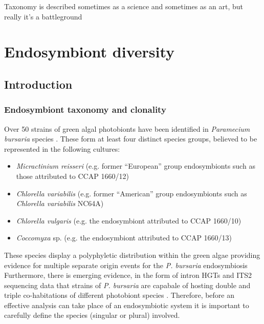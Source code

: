 % 
\graphicspath{{chapters/3.Chapter_1/figures/}}


\begin{savequote}[75mm]
    Taxonomy is described sometimes as a science and sometimes as an art, but really it's a battleground
\end{savequote}

\chapter{Endosymbiont diversity}\label{chap:endo_diversity}

\section{Introduction}

\subsection{Endosymbiont taxonomy and clonality}

Over 50 strains of green algal photobionts have been identified in 
\textit{Paramecium bursaria} species \citep{Hoshina2010,Hoshina2004,Hoshina2009,Summerer2008,Vorobyev2009}. 
These form at least four distinct species groups, believed to be represented
in the following cultures:
\begin{itemize}
    \item \textit{Micractinium reisseri} (e.g. former ``European'' group endosymbionts such as those attributed to CCAP 1660/12)
    \item \textit{Chlorella variabilis} (e.g. former ``American'' group endosymbionts such as \textit{Chlorella variabilis} NC64A)
    \item \textit{Chlorella vulgaris} (e.g. the endosymbiont attributed to CCAP 1660/10)
    \item \textit{Coccomyxa} sp. (e.g. the endosymbiont attributed to CCAP 1660/13)
\end{itemize}
These species display a polyphyletic distribution within the green algae
providing evidence for multiple separate origin events for
the \textit{P. bursaria} endosymbiosis \citep{Hoshina2008,Hoshina2009}
Furthermore, there is emerging evidence, in the form
of intron HGTs and ITS2 sequencing data that strains of \textit{P. bursaria}
are capabale of hosting double and triple co-habitations of different
photobiont species \citep{Hoshina2012}. Therefore,
before an effective analysis can take place of
an endosymbiotic system it is important
to carefully define the species (singular or plural)
involved.


